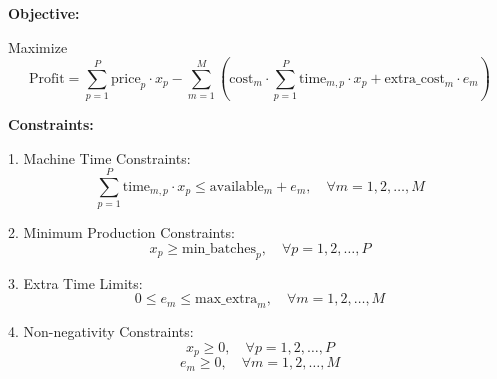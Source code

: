 \documentclass{article}
\begin{document}
\textbf{Objective:}

Maximize
\[
\text{Profit} = \sum_{p=1}^{P} \text{price}_p \cdot x_p - \sum_{m=1}^{M} \left( \text{cost}_m \cdot \sum_{p=1}^{P} \text{time}_{m,p} \cdot x_p + \text{extra\_cost}_m \cdot e_m \right)
\]

\textbf{Constraints:}

1. Machine Time Constraints:
\[
\sum_{p=1}^{P} \text{time}_{m,p} \cdot x_p \leq \text{available}_m + e_m, \quad \forall m = 1, 2, \ldots, M
\]

2. Minimum Production Constraints:
\[
x_p \geq \text{min\_batches}_p, \quad \forall p = 1, 2, \ldots, P
\]

3. Extra Time Limits:
\[
0 \leq e_m \leq \text{max\_extra}_m, \quad \forall m = 1, 2, \ldots, M
\]

4. Non-negativity Constraints:
\[
x_p \geq 0, \quad \forall p = 1, 2, \ldots, P
\]
\[
e_m \geq 0, \quad \forall m = 1, 2, \ldots, M
\]
\end{document}
